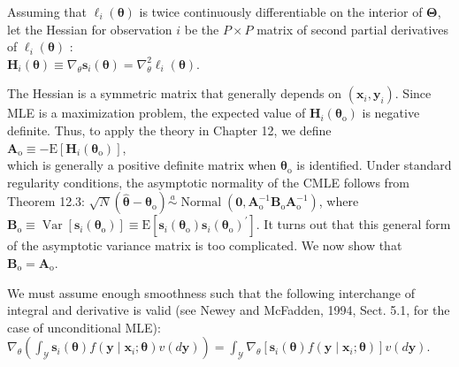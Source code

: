 \documentclass[10pt]{article}
\begin{document}
Assuming that $\ell_{i}(\boldsymbol{\theta})$ is twice continuously differentiable on the interior of $\boldsymbol{\Theta}$, let the Hessian for observation $i$ be the $P \times P$ matrix of second partial derivatives of $\ell_{i}(\boldsymbol{\theta})$ :\\
$\mathbf{H}_{i}(\boldsymbol{\theta}) \equiv \nabla_{\theta} \mathbf{s}_{i}(\boldsymbol{\theta})=\nabla_{\theta}^{2} \ell_{i}(\boldsymbol{\theta})$.

The Hessian is a symmetric matrix that generally depends on $\left(\mathbf{x}_{i}, \mathbf{y}_{i}\right)$. Since MLE is a maximization problem, the expected value of $\mathbf{H}_{i}\left(\boldsymbol{\theta}_{\mathrm{o}}\right)$ is negative definite. Thus, to apply the theory in Chapter 12, we define\\
$\mathbf{A}_{\mathrm{o}} \equiv-\mathrm{E}\left[\mathbf{H}_{i}\left(\boldsymbol{\theta}_{\mathrm{o}}\right)\right]$,\\
which is generally a positive definite matrix when $\boldsymbol{\theta}_{\mathrm{o}}$ is identified. Under standard regularity conditions, the asymptotic normality of the CMLE follows from Theorem 12.3: $\sqrt{N}\left(\hat{\boldsymbol{\theta}}-\boldsymbol{\theta}_{\mathrm{o}}\right) \stackrel{a}{\sim} \operatorname{Normal}\left(\mathbf{0}, \mathbf{A}_{\mathrm{o}}^{-1} \mathbf{B}_{\mathrm{o}} \mathbf{A}_{\mathrm{o}}^{-1}\right)$, where $\mathbf{B}_{\mathrm{o}} \equiv \operatorname{Var}\left[\mathbf{s}_{i}\left(\boldsymbol{\theta}_{\mathrm{o}}\right)\right] \equiv \mathrm{E}\left[\mathbf{s}_{i}\left(\boldsymbol{\theta}_{\mathrm{o}}\right) \mathbf{s}_{i}\left(\boldsymbol{\theta}_{\mathrm{o}}\right)^{\prime}\right]$. It turns out that this general form of the asymptotic variance matrix is too complicated. We now show that $\mathbf{B}_{\mathrm{o}}=\mathbf{A}_{\mathrm{o}}$.

We must assume enough smoothness such that the following interchange of integral and derivative is valid (see Newey and McFadden, 1994, Sect. 5.1, for the case of unconditional MLE):\\
$\nabla_{\theta}\left(\int_{\mathscr{Y}} \mathbf{s}_{i}(\boldsymbol{\theta}) f\left(\mathbf{y} \mid \mathbf{x}_{i} ; \boldsymbol{\theta}\right) v(d \mathbf{y})\right)=\int_{\mathscr{Y}} \nabla_{\theta}\left[\mathbf{s}_{i}(\boldsymbol{\theta}) f\left(\mathbf{y} \mid \mathbf{x}_{i} ; \boldsymbol{\theta}\right)\right] v(d \mathbf{y})$.
\end{document}
